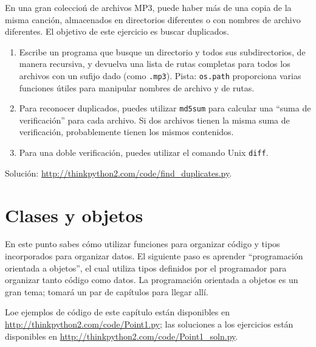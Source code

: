 \documentclass[10pt]{book}
\begin{document}
\begin{exercise}
\label{checksum}

En una gran coleccioń de archivos MP3, puede haber más de una
copia de la misma canción, almacenados en directorios diferentes o con
nombres de archivo diferentes.  El objetivo de este ejercicio es buscar
duplicados.

\begin{enumerate}

\item Escribe un programa que busque un directorio y todos sus
subdirectorios, de manera recursiva, y devuelva una lista de rutas completas
para todos los archivos con un sufijo dado (como {\tt .mp3}).
Pista: {\tt os.path} proporciona varias funciones útiles para
manipular nombres de archivo y de rutas.

\item Para reconocer duplicados, puedes utilizar {\tt md5sum}
para calcular una ``suma de verificación'' para cada archivo.  Si dos archivos tienen
la misma suma de verificación, probablemente tienen los mismos contenidos.

\item Para una doble verificación, puedes utilizar el comando Unix {\tt diff}.

\end{enumerate}

Solución: \url{http://thinkpython2.com/code/find_duplicates.py}.

\end{exercise}



\chapter{Clases y objetos}
\label{clobjects}

En este punto sabes cómo utilizar
funciones para organizar código y
tipos incorporados para organizar datos.  El siguiente paso es aprender
``programación orientada a objetos'', el cual utiliza tipos definidos por el programador
para organizar tanto código como datos.  La programación orientada a objetos es
un gran tema; tomará un par de capítulos para llegar allí.

Loe ejemplos de código de este capítulo están disponibles en
\url{http://thinkpython2.com/code/Point1.py}; las soluciones
a los ejercicios están disponibles en
\url{http://thinkpython2.com/code/Point1_soln.py}.
\end{document}
